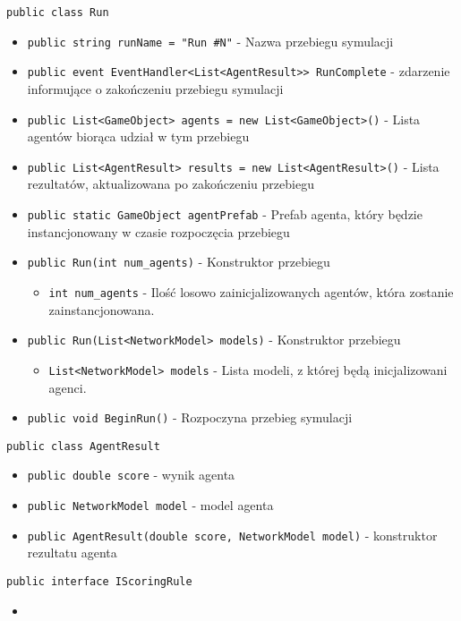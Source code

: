 \documentclass[12pt,a4paper]{article}
\begin{document}
\lstinline{public class Run}
\begin{itemize}
    \item \lstinline|public string runName = "Run #N"| - Nazwa przebiegu symulacji
    \item \lstinline|public event EventHandler<List<AgentResult>> RunComplete| - zdarzenie informujące o zakończeniu przebiegu symulacji
    \item \lstinline|public List<GameObject> agents = new List<GameObject>()| - Lista agentów biorąca udział w tym przebiegu
    \item \lstinline|public List<AgentResult> results = new List<AgentResult>()| - Lista rezultatów, aktualizowana po zakończeniu przebiegu
    \item \lstinline|public static GameObject agentPrefab| - Prefab agenta, który będzie instancjonowany w czasie rozpoczęcia przebiegu
    \item \lstinline|public Run(int num_agents)| - Konstruktor przebiegu
          \begin{itemize}
              \item \lstinline{int num_agents} - Ilość losowo zainicjalizowanych agentów, która zostanie zainstancjonowana.
          \end{itemize}
    \item \lstinline|public Run(List<NetworkModel> models)| -  Konstruktor przebiegu
          \begin{itemize}
              \item \lstinline{List<NetworkModel> models} - Lista modeli, z której będą inicjalizowani agenci.
          \end{itemize}
    \item \lstinline|public void BeginRun()| - Rozpoczyna przebieg symulacji
\end{itemize}

\lstinline{public class AgentResult}
\begin{itemize}
    \item \lstinline|public double score| - wynik agenta
    \item \lstinline|public NetworkModel model| - model agenta
    \item \lstinline|public AgentResult(double score, NetworkModel model)| - konstruktor rezultatu agenta
\end{itemize}


\lstinline{public interface IScoringRule}
\begin{itemize}
    \item \lstinline||
\end{itemize}
\end{document}
